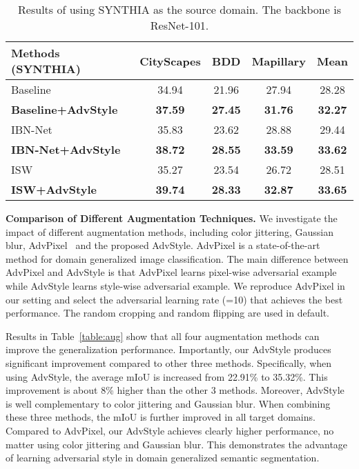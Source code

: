 \documentclass{article}
\newcommand{\ours}{AdvStyle\xspace}
\begin{document}
\begin{table}[!t]
\setlength{\tabcolsep}{3pt}
\caption{Results of using SYNTHIA as the source domain. The backbone is ResNet-101.} 
\begin{center}
\footnotesize
\begin{tabular}{l|c|c|c|c}
\toprule
Methods (SYNTHIA) & \multicolumn{1}{c|}{CityScapes} & \multicolumn{1}{c|}{BDD} & \multicolumn{1}{c|}{Mapillary} & \multicolumn{1}{c}{Mean}\\
\midrule
\midrule
{\cellcolor[gray]{1}}Baseline & 34.94		&	21.96	&		27.94&28.28 \\
\textbf{Baseline+AdvStyle}& \bf 37.59&	\bf 27.45&	\bf	31.76&	\bf 32.27\\
\cmidrule[.0001in]{1-5}
{\cellcolor[gray]{1}}IBN-Net& 35.83&			23.62		&	28.88	&		29.44\\
{\cellcolor[gray]{1}}\textbf{IBN-Net+AdvStyle} & \bf 38.72	&	\bf	28.55&	\bf 33.59&	\bf 33.62\\
\cmidrule[.0001in]{1-5}
{\cellcolor[gray]{1}}ISW& 35.27&			23.54	&	26.72	&		28.51\\
{\cellcolor[gray]{1}}\textbf{ISW+AdvStyle} &\bf 39.74&	\bf	28.33&\bf	32.87&	\bf 33.65\\
\bottomrule
\end{tabular}
\end{center}
\label{table:synthia}
\end{table}




\textbf{Comparison of Different Augmentation Techniques.} We investigate the impact of different augmentation methods, including color jittering, Gaussian blur, AdvPixel~\cite{volpi2018generalizing} and the proposed \ours. AdvPixel is a state-of-the-art method for domain generalized image classification. The main difference between AdvPixel and \ours is that AdvPixel learns pixel-wise adversarial example while \ours learns style-wise adversarial example. We reproduce AdvPixel in our setting and select the adversarial learning rate (=10) that achieves the best performance. The random cropping and random flipping are used in default. 

Results in Table~\ref{table:aug} show that all four augmentation methods can improve the generalization performance. Importantly, our \ours produces significant improvement compared to other three methods. Specifically, when using \ours, the average mIoU is increased from 22.91\% to 35.32\%. This improvement is about 8\% higher than the other 3 methods. Moreover, \ours is well complementary to color jittering and Gaussian blur. When combining these three methods, the mIoU is further improved in all target domains. Compared to AdvPixel, our \ours achieves clearly higher performance, no matter using color jittering and Gaussian blur. This demonstrates the advantage of learning adversarial style in domain generalized semantic segmentation.
\end{document}
